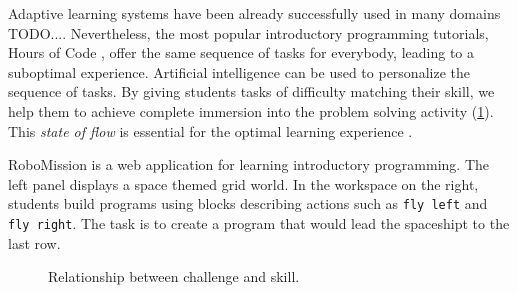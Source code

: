 Adaptive learning systems have been already successfully used in many domains
\cite{mathsgarden, alg.evaluation-geography, matmat.response-times}
TODO....
Nevertheless, the most popular introductory programming tutorials,
Hours of Code \cite{hour-of-code},
offer the same sequence of tasks for everybody,
leading to a suboptimal experience.
Artificial intelligence can be used to personalize the sequence of tasks.
By giving students tasks of difficulty matching their skill,
we help them to achieve complete immersion into the problem solving
activity (\cref{fig:flow}).
This \emph{state of flow} \cite{flow}
is essential for the optimal learning experience
\cite{adaptive-practice}.



%
  {RoboMission is a web application for learning introductory programming.
   The left panel displays a space themed grid world. In the workspace on
   the right, students build programs using blocks describing actions
   such as \texttt{fly left} and \texttt{fly right}.
   The task is to create a program that would lead the spaceshipt to the last row.}




\begin{figure}[htb]
  \centering
  \caption{Relationship between challenge and skill.}
  \label{fig:flow}
\end{figure}

